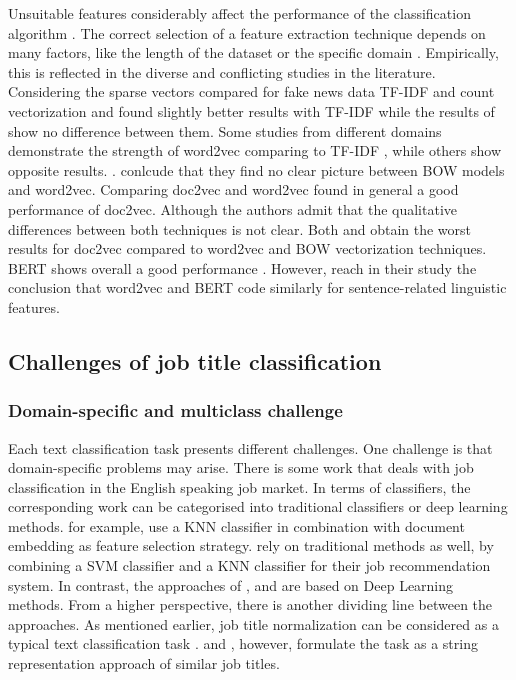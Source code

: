 \documentclass[12pt, a4paper, titlepage]{article}
\begin{document}
Unsuitable features considerably affect the performance of the classification algorithm \citep{cahyani2021}. The correct selection of a feature extraction technique depends on many factors, like the length of the dataset or the specific domain \citep{arora2021}. Empirically, this is reflected in the diverse and conflicting studies in the literature. Considering the sparse vectors \citep{wendland2021} compared for fake news data \ac{TF-IDF} and count vectorization and found slightly better results with \ac{TF-IDF} while the results of \citet{WangY2017} show no difference between them. Some studies from different domains demonstrate the strength of word2vec comparing to \ac{TF-IDF} \citep{arora2021, rahmawati2016}, while others show opposite results. \citep{zhu2016,cahyani2021}. \citet{shao2018} conlcude that they find no clear picture between \ac{BOW} models and word2vec. Comparing doc2vec and word2vec \citet{lau2016} found in general a good performance of doc2vec. Although the authors admit that the qualitative differences between both techniques is not clear. Both \citet{shao2018} and \citet{WangY2017} obtain the worst results for doc2vec compared to word2vec and \ac{BOW} vectorization techniques. \ac{BERT} shows overall a good performance \citep{gonzalez2020}. However, \citet{miaschi2020} reach in their study the conclusion that word2vec and BERT code similarly for sentence-related linguistic features. 

\subsection{Challenges of job title classification}
\subsubsection*{Domain-specific and multiclass challenge}
Each text classification task presents different challenges. One challenge is that domain-specific problems may arise. There is some work that deals with job classification in the English speaking job market. 
In terms of classifiers, the corresponding work can be categorised into traditional classifiers or deep learning methods. \cite{Zhu2017} for example, use a KNN classifier in combination with document embedding as feature selection strategy. \cite{Javed2015} rely on traditional methods as well, by combining a SVM classifier and a KNN classifier for their job recommendation system. In contrast, the approaches of \cite{Decorte2021}, \cite{WangJ2019} and \cite{Neculoiu2016} are based on Deep Learning methods. From a higher perspective, there is another dividing line between the approaches. As mentioned earlier, job title normalization can be considered as a typical text classification task \citep{WangJ2019, Javed2015, Zhu2017}. \cite{Decorte2021} and \cite{Neculoiu2016}, however, formulate the task as a string representation approach of similar job titles.  
\end{document}
